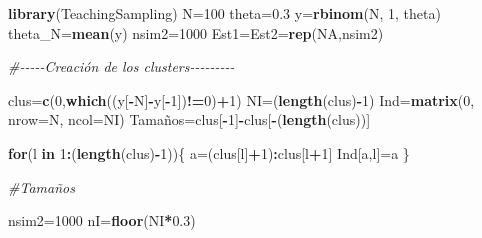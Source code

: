 \documentclass[
  12pt,
]{book}
\newenvironment{Shaded}{\begin{snugshade}}{\end{snugshade}}
\newcommand{\AttributeTok}[1]{\textcolor[rgb]{0.13,0.29,0.53}{#1}}
\newcommand{\CommentTok}[1]{\textcolor[rgb]{0.56,0.35,0.01}{\textit{#1}}}
\newcommand{\ConstantTok}[1]{\textcolor[rgb]{0.56,0.35,0.01}{#1}}
\newcommand{\ControlFlowTok}[1]{\textcolor[rgb]{0.13,0.29,0.53}{\textbf{#1}}}
\newcommand{\DecValTok}[1]{\textcolor[rgb]{0.00,0.00,0.81}{#1}}
\newcommand{\FloatTok}[1]{\textcolor[rgb]{0.00,0.00,0.81}{#1}}
\newcommand{\FunctionTok}[1]{\textcolor[rgb]{0.13,0.29,0.53}{\textbf{#1}}}
\newcommand{\NormalTok}[1]{#1}
\newcommand{\OtherTok}[1]{\textcolor[rgb]{0.56,0.35,0.01}{#1}}
\newcommand{\SpecialCharTok}[1]{\textcolor[rgb]{0.81,0.36,0.00}{\textbf{#1}}}
\begin{document}
\begin{Shaded}
\begin{Highlighting}[]
\FunctionTok{library}\NormalTok{(TeachingSampling)}
\NormalTok{N}\OtherTok{=}\DecValTok{100}
\NormalTok{theta}\OtherTok{=}\FloatTok{0.3}
\NormalTok{y}\OtherTok{=}\FunctionTok{rbinom}\NormalTok{(N, }\DecValTok{1}\NormalTok{, theta)}
\NormalTok{theta\_N}\OtherTok{=}\FunctionTok{mean}\NormalTok{(y)}
\NormalTok{nsim2}\OtherTok{=}\DecValTok{1000}
\NormalTok{Est1}\OtherTok{=}\NormalTok{Est2}\OtherTok{=}\FunctionTok{rep}\NormalTok{(}\ConstantTok{NA}\NormalTok{,nsim2)}

\CommentTok{\#{-}{-}{-}{-}{-}Creación de los clusters{-}{-}{-}{-}{-}{-}{-}{-}{-}}

\NormalTok{clus}\OtherTok{=}\FunctionTok{c}\NormalTok{(}\DecValTok{0}\NormalTok{,}\FunctionTok{which}\NormalTok{((y[}\SpecialCharTok{{-}}\NormalTok{N]}\SpecialCharTok{{-}}\NormalTok{y[}\SpecialCharTok{{-}}\DecValTok{1}\NormalTok{])}\SpecialCharTok{!=}\DecValTok{0}\NormalTok{)}\SpecialCharTok{+}\DecValTok{1}\NormalTok{)}
\NormalTok{NI}\OtherTok{=}\NormalTok{(}\FunctionTok{length}\NormalTok{(clus)}\SpecialCharTok{{-}}\DecValTok{1}\NormalTok{)}
\NormalTok{Ind}\OtherTok{=}\FunctionTok{matrix}\NormalTok{(}\DecValTok{0}\NormalTok{, }\AttributeTok{nrow=}\NormalTok{N, }\AttributeTok{ncol=}\NormalTok{NI)}
\NormalTok{Tamaños}\OtherTok{=}\NormalTok{clus[}\SpecialCharTok{{-}}\DecValTok{1}\NormalTok{]}\SpecialCharTok{{-}}\NormalTok{clus[}\SpecialCharTok{{-}}\NormalTok{(}\FunctionTok{length}\NormalTok{(clus))]}

\ControlFlowTok{for}\NormalTok{(l }\ControlFlowTok{in} \DecValTok{1}\SpecialCharTok{:}\NormalTok{(}\FunctionTok{length}\NormalTok{(clus)}\SpecialCharTok{{-}}\DecValTok{1}\NormalTok{))\{}
\NormalTok{a}\OtherTok{=}\NormalTok{(clus[l]}\SpecialCharTok{+}\DecValTok{1}\NormalTok{)}\SpecialCharTok{:}\NormalTok{clus[l}\SpecialCharTok{+}\DecValTok{1}\NormalTok{]}
\NormalTok{Ind[a,l]}\OtherTok{=}\NormalTok{a}
\NormalTok{\}}

\CommentTok{\#Tamaños}

\NormalTok{nsim2}\OtherTok{=}\DecValTok{1000}
\NormalTok{nI}\OtherTok{=}\FunctionTok{floor}\NormalTok{(NI}\SpecialCharTok{*}\FloatTok{0.3}\NormalTok{)}


\end{Highlighting}
\end{Shaded}
\end{document}
